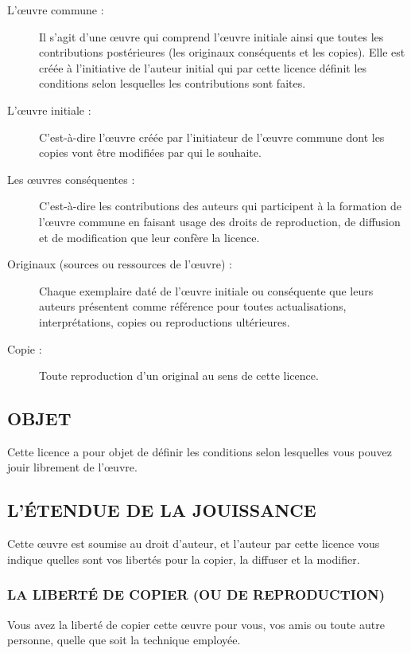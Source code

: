 \begin{description}
    \item[L'\oe uvre commune :]
Il s'agit d'une \oe uvre qui comprend l'\oe uvre initiale ainsi que toutes les contributions post\'erieures (les originaux cons\'equents et les copies). Elle est cr\'e\'ee \`a l'initiative de l'auteur initial qui par cette licence d\'efinit les conditions selon lesquelles les contributions sont faites.

    \item[L'\oe uvre initiale :]
C'est-\`a-dire l'\oe uvre cr\'e\'ee par l'initiateur de l'\oe uvre commune dont les copies vont \^etre modifi\'ees par qui le souhaite.

    \item[Les \oe uvres cons\'equentes :]
C'est-\`a-dire les contributions des auteurs qui participent \`a la formation de l'\oe uvre commune en faisant usage des droits de reproduction, de diffusion et de modification que leur conf\`ere la licence.

    \item[Originaux (sources ou ressources de l'\oe uvre) :]
Chaque exemplaire dat\'e de l'\oe uvre initiale ou cons\'equente que leurs auteurs pr\'esentent comme r\'ef\'erence pour toutes actualisations, interpr\'etations, copies ou reproductions ult\'erieures.

    \item[Copie :]
Toute reproduction d'un original au sens de cette licence.

\end{description}

\subsection{OBJET}
Cette licence a pour objet de d\'efinir les conditions selon lesquelles vous pouvez jouir librement de l'\oe uvre.

\subsection{L'\'ETENDUE DE LA JOUISSANCE}
Cette \oe uvre est soumise au droit d'auteur, et l'auteur par cette licence vous indique quelles sont vos libert\'es pour la copier, la diffuser et la modifier.

\subsubsection{LA LIBERT\'E DE COPIER (OU DE REPRODUCTION)}
Vous avez la libert\'e de copier cette \oe uvre pour vous, vos amis ou toute autre personne, quelle que soit la technique employ\'ee.

